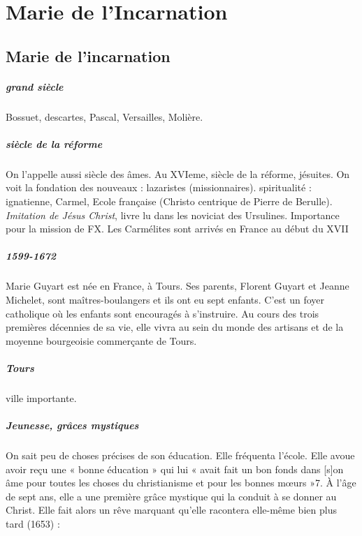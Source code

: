 \chapter{Marie de l'Incarnation}


\section{Marie de l'incarnation}


\paragraph{grand siècle} Bossuet, descartes, Pascal, Versailles, Molière. 

\paragraph{siècle de la réforme}On l'appelle aussi siècle des âmes. Au XVIeme, siècle de la réforme, jésuites. On voit la fondation des nouveaux : lazaristes (missionnaires). spiritualité : ignatienne, Carmel, Ecole française (Christo centrique de Pierre de Berulle). \textit{Imitation de Jésus Christ}, livre lu dans les noviciat des Ursulines. Importance pour la mission de FX. Les Carmélites sont arrivés en France au début du XVII


\paragraph{1599-1672}

Marie Guyart est née en France, à Tours. Ses parents, Florent Guyart et Jeanne Michelet, sont maîtres-boulangers et ils ont eu sept enfants. C'est un foyer catholique où les enfants sont encouragés à s'instruire. Au cours des trois premières décennies de sa vie, elle vivra au sein du monde des artisans et de la moyenne bourgeoisie commerçante de Tours.
\paragraph{Tours} ville importante. 

\paragraph{Jeunesse, grâces mystiques}
On sait peu de choses précises de son éducation. Elle fréquenta l'école. Elle avoue avoir reçu une « bonne éducation » qui lui « avait fait un bon fonds dans [s]on âme pour toutes les choses du christianisme et pour les bonnes mœurs »7. À l'âge de sept ans, elle a une première grâce mystique qui la conduit à se donner au Christ. Elle fait alors un rêve marquant qu'elle racontera elle-même bien plus tard (1653) :

